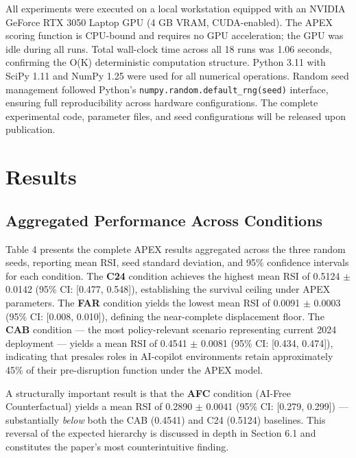 \documentclass[10pt, conference]{IEEEtran}
\begin{document}
{\label{sec:hardware_and_runtime}

All experiments were executed on a local workstation equipped with an NVIDIA GeForce RTX 3050 Laptop GPU (4 GB VRAM, CUDA-enabled). The APEX scoring function is CPU-bound and requires no GPU acceleration; the GPU was idle during all runs. Total wall-clock time across all 18 runs was 1.06 seconds, confirming the O(K) deterministic computation structure. Python 3.11 with SciPy 1.11 \cite{virtanen2020scipy} and NumPy 1.25 were used for all numerical operations. Random seed management followed Python's \texttt{numpy.random.default\_rng(seed)} interface, ensuring full reproducibility across hardware configurations. The complete experimental code, parameter files, and seed configurations will be released upon publication.

\section{Results}

\label{sec:results}

\subsection{Aggregated Performance Across Conditions}

\label{sec:aggregated_performance_across_conditions}

Table 4 presents the complete APEX results aggregated across the three random seeds, reporting mean RSI, seed standard deviation, and 95\% confidence intervals for each condition. The \textbf{C24} condition achieves the highest mean RSI of 0.5124 $\pm$ 0.0142 (95\% CI: [0.477, 0.548]), establishing the survival ceiling under APEX parameters. The \textbf{FAR} condition yields the lowest mean RSI of 0.0091 $\pm$ 0.0003 (95\% CI: [0.008, 0.010]), defining the near-complete displacement floor. The \textbf{CAB} condition --- the most policy-relevant scenario representing current 2024 deployment --- yields a mean RSI of 0.4541 $\pm$ 0.0081 (95\% CI: [0.434, 0.474]), indicating that presales roles in AI-copilot environments retain approximately 45\% of their pre-disruption function under the APEX model.

A structurally important result is that the \textbf{AFC} condition (AI-Free Counterfactual) yields a mean RSI of 0.2890 $\pm$ 0.0041 (95\% CI: [0.279, 0.299]) --- substantially \textit{below} both the CAB (0.4541) and C24 (0.5124) baselines. This reversal of the expected hierarchy is discussed in depth in Section 6.1 and constitutes the paper's most counterintuitive finding.

}
\end{document}
